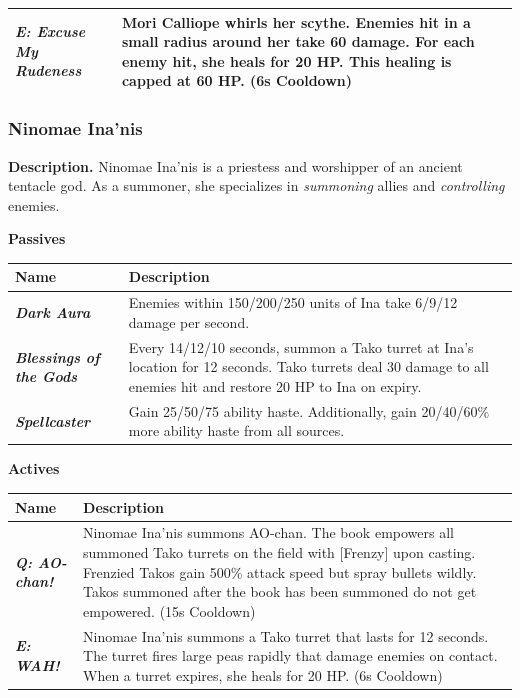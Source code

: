 \documentclass[10pt, a4paper]{article}
\begin{document}
\begin{multicols}{2}
\begin{center}
\begin{tabular}{|p{2.7cm}|p{5.5cm}|}
			\textit{\textbf{E: Excuse My Rudeness}} & Mori Calliope whirls her scythe. Enemies hit in a small radius around her take 60 damage. For each enemy hit, she heals for 20 HP. This healing is capped at 60 HP. (6s Cooldown) \\

			\hline
		\end{tabular}
	\end{center}

	\subsubsection{Ninomae Ina'nis}
  	
  	\textbf{Description.} Ninomae Ina'nis is a priestess and worshipper of an ancient tentacle god. As a summoner, she specializes in \textit{summoning} allies and \textit{controlling} enemies.

	\textbf{Passives}
	
	\begin{center}
		\begin{tabular}{|p{2.7cm}|p{5.5cm}|}
		\hline
		\textbf{Name} & \textbf{Description} \\
		\hline
		\textit{\textbf{Dark Aura}} & Enemies within 150/200/250 units of Ina take 6/9/12 damage per second. \\
		\textit{\textbf{Blessings of the Gods}} & Every 14/12/10 seconds, summon a Tako turret at Ina's location for 12 seconds. Tako turrets deal 30 damage to all enemies hit and restore 20 HP to Ina on expiry. \\
		\textit{\textbf{Spellcaster}} & Gain 25/50/75 ability haste. Additionally, gain 20/40/60\% more ability haste from all sources. \\
		\hline
		\end{tabular}
		\end{center}
	
	\begin{center}
		\textbf{Actives}
	\end{center}
	
	\begin{center}
		\begin{tabular}{|p{2.7cm}|p{5.5cm}|}
			\hline
			\textbf{Name} & \textbf{Description} \\
			\hline
			\textit{\textbf{Q: AO-chan!}} & Ninomae Ina'nis summons AO-chan. The book empowers all summoned Tako turrets on the field with [Frenzy] upon casting. Frenzied Takos gain 500\% attack speed but spray bullets wildly. Takos summoned after the book has been summoned do not get empowered. (15s Cooldown)\\
			\textit{\textbf{E: WAH!}} & Ninomae Ina'nis summons a Tako turret that lasts for 12 seconds. The turret fires large peas rapidly that damage enemies on contact. When a turret expires, she heals for 20 HP. (6s Cooldown) \\
			\hline
		\end{tabular}
	\end{center}
  	

\end{multicols}
\end{document}
